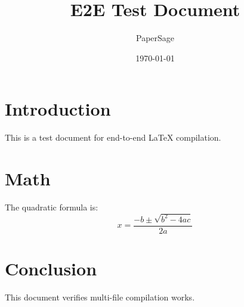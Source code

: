 \documentclass{article}
\title{E2E Test Document}
\author{PaperSage}
\date{\today}
\begin{document}
\maketitle

\section{Introduction}
This is a test document for end-to-end LaTeX compilation.

\section{Math}
The quadratic formula is:
\begin{equation}
  x = \frac{-b \pm \sqrt{b^2 - 4ac}}{2a}
\end{equation}

\section{Conclusion}
This document verifies multi-file compilation works.
\end{document}
